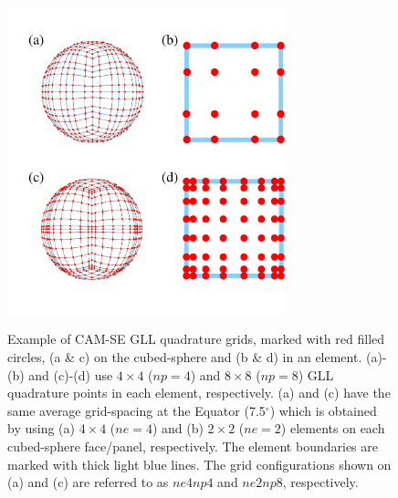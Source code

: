 \documentclass[twocol]{ametsoc}
\begin{document}
\begin{figure}[t]
\noindent\includegraphics[width=19pc,angle=0]{figs/quadrature-fig/gll.pdf}\\
\caption{Example of CAM-SE GLL quadrature grids, marked with red filled circles, (a \& c) on the cubed-sphere and (b \& d) in an element. (a)-(b) and (c)-(d) use $4\times 4$ ($np=4$) and $8\times 8$ ($np=8$) GLL quadrature points in each element, respectively. (a) and (c) have the same average grid-spacing at the Equator (7.5$^\circ$) which is obtained by using (a) $4\times 4$ ($ne=4$) and (b) $2\times 2$ ($ne=2$) elements on each cubed-sphere face/panel, respectively. The element boundaries are marked with thick light blue lines. The grid configurations shown on (a) and (c) are referred to as $ne4np4$ and $ne2np8$, respectively.}
\label{fig:gll-grids}
\end{figure}
\end{document}

